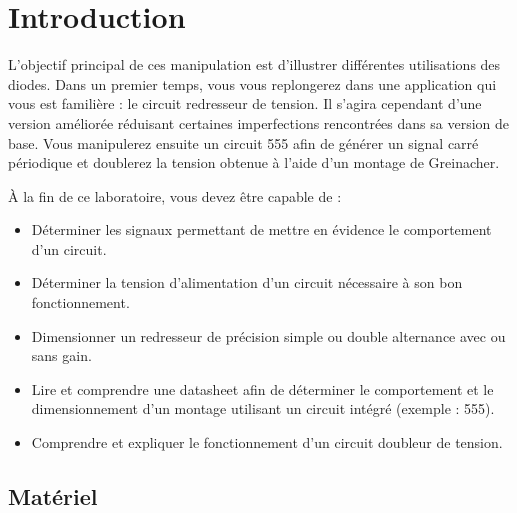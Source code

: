 \documentclass{../../template/labo}
\author{GEI}
\begin{document}

\section{Introduction}
L'objectif principal de ces manipulation est d'illustrer différentes utilisations des diodes.
Dans un premier temps, vous vous replongerez dans une application qui vous est familière : le circuit redresseur de tension. Il s'agira cependant d'une version améliorée réduisant certaines imperfections rencontrées dans sa version de base.
Vous manipulerez ensuite un circuit 555 afin de générer un signal carré périodique et doublerez la tension obtenue à l'aide d'un montage de Greinacher.


À la fin de ce laboratoire, vous devez être capable de :
\begin{itemize}
\item Déterminer les signaux permettant de mettre en évidence le comportement d'un circuit.
\item Déterminer la tension d'alimentation d'un circuit nécessaire à son bon fonctionnement.
\item Dimensionner un redresseur de précision simple ou double alternance avec ou sans gain.
\item Lire et comprendre une datasheet afin de déterminer le comportement et le dimensionnement d'un montage utilisant un circuit intégré (exemple : 555).
\item Comprendre et expliquer le fonctionnement d'un circuit doubleur de tension.
\end{itemize}

\subsection{Matériel}
\end{document}

